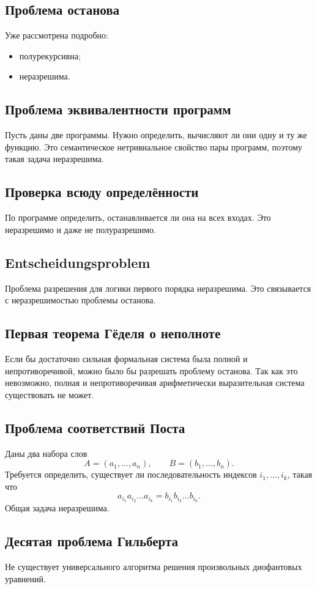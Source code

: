 \documentclass[12pt,a4paper]{article}
\begin{document}
\subsection{Проблема останова}
Уже рассмотрена подробно:
\begin{itemize}
    \item полурекурсивна;
    \item неразрешима.
\end{itemize}

\subsection{Проблема эквивалентности программ}
Пусть даны две программы. Нужно определить, вычисляют ли они одну и ту же функцию.
Это семантическое нетривиальное свойство пары программ, поэтому такая задача неразрешима.

\subsection{Проверка всюду определённости}
По программе определить, останавливается ли она на всех входах. Это неразрешимо и даже не полуразрешимо.

\subsection{Entscheidungsproblem}
Проблема разрешения для логики первого порядка неразрешима. Это связывается с неразрешимостью проблемы останова.

\subsection{Первая теорема Гёделя о неполноте}
Если бы достаточно сильная формальная система была полной и непротиворечивой, можно было бы разрешать проблему останова. Так как это невозможно, полная и непротиворечивая арифметически выразительная система существовать не может.

\subsection{Проблема соответствий Поста}
Даны два набора слов
\[
A=(a_1,\dots,a_n), \qquad B=(b_1,\dots,b_n).
\]
Требуется определить, существует ли последовательность индексов $i_1,\dots,i_k$, такая что
\[
a_{i_1}a_{i_2}\dots a_{i_k}=b_{i_1}b_{i_2}\dots b_{i_k}.
\]
Общая задача неразрешима.

\subsection{Десятая проблема Гильберта}
Не существует универсального алгоритма решения произвольных диофантовых уравнений.
\end{document}
